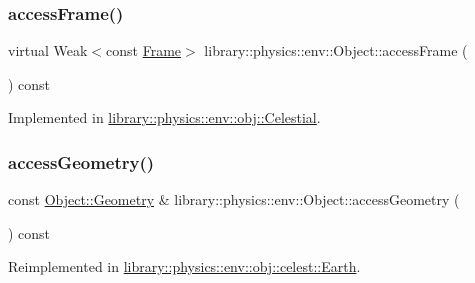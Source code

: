 \subsubsection{\texorpdfstring{access\+Frame()}{accessFrame()}}
{\footnotesize\ttfamily virtual Weak$<$const \hyperlink{classlibrary_1_1physics_1_1coord_1_1_frame}{Frame}$>$ library\+::physics\+::env\+::\+Object\+::access\+Frame (\begin{DoxyParamCaption}{ }\end{DoxyParamCaption}) const\hspace{0.3cm}{\ttfamily [pure virtual]}}



Implemented in \hyperlink{classlibrary_1_1physics_1_1env_1_1obj_1_1_celestial_a2c3035480bad1749f12d1170113ba2ad}{library\+::physics\+::env\+::obj\+::\+Celestial}.

\mbox{\label{classlibrary_1_1physics_1_1env_1_1_object_ac7a98e912dadb573e557eb91c8f5e891}} 
\subsubsection{\texorpdfstring{access\+Geometry()}{accessGeometry()}}
{\footnotesize\ttfamily const \hyperlink{classlibrary_1_1physics_1_1env_1_1_object_a750fd821b17667fec9e0a4eda23af048}{Object\+::\+Geometry} \& library\+::physics\+::env\+::\+Object\+::access\+Geometry (\begin{DoxyParamCaption}{ }\end{DoxyParamCaption}) const\hspace{0.3cm}{\ttfamily [virtual]}}



Reimplemented in \hyperlink{classlibrary_1_1physics_1_1env_1_1obj_1_1celest_1_1_earth_a5c6a6a902eb52c3f74e20dd7aa5ad359}{library\+::physics\+::env\+::obj\+::celest\+::\+Earth}.

\mbox{\label{classlibrary_1_1physics_1_1env_1_1_object_a3f183331fd0ad20e88cae41e2491a5dc}} 
